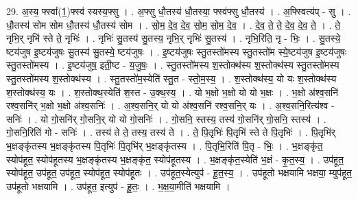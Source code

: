 \documentclass[17pt]{extarticle}
\begin{document}
29. अ॒स्य॒ फ्स्वा᳚(1॒)फ्स्व॑ स्यस्य॒फ्सु । . अ॒फ्सु धौ॒तस्य॑ धौ॒तस्या॒ फ्स्व॑फ्सु धौ॒तस्य॑ । . अ॒फ्स्वित्य॑प् - सु । . धौ॒तस्य॑ सोम सोम धौ॒तस्य॑ धौ॒तस्य॑ सोम । . सो॒म॒ दे॒व॒ दे॒व॒ सो॒म॒ सो॒म॒ दे॒व॒ । . दे॒व॒ ते॒ ते॒ दे॒व॒ दे॒व॒ ते॒ । . ते॒ नृभि॒र् नृभि॑ स्ते ते॒ नृभिः॑ । . नृभिः॑ सु॒तस्य॑ सु॒तस्य॒ नृभि॒र् नृभिः॑ सु॒तस्य॑ । . नृभि॒रिति॒ नृ - भिः॒ । . सु॒तस्ये॒ ष्टय॑जुष इ॒ष्टय॑जुषः सु॒तस्य॑ सु॒तस्ये॒ ष्टय॑जुषः । . इ॒ष्टय॑जुषः स्तु॒तस्तो॑मस्य स्तु॒तस्तो॑म स्ये॒ष्टय॑जुष इ॒ष्टय॑जुषः स्तु॒तस्तो॑मस्य । . इ॒ष्टय॑जुष॒ इती॒ष्ट - य॒जु॒षः॒ । . स्तु॒तस्तो॑मस्य श॒स्तोक्थ॑स्य श॒स्तोक्थ॑स्य स्तु॒तस्तो॑मस्य स्तु॒तस्तो॑मस्य श॒स्तोक्थ॑स्य । . स्तु॒तस्तो॑म॒स्येति॑ स्तु॒त - स्तो॒म॒स्य॒ । . श॒स्तोक्थ॑स्य॒ यो यः श॒स्तोक्थ॑स्य श॒स्तोक्थ॑स्य॒ यः । . श॒स्तोक्थ॒स्येति॑ श॒स्त - उ॒क्थ॒स्य॒ । . यो भ॒क्षो भ॒क्षो यो यो भ॒क्षः । . भ॒क्षो अ॑श्व॒सनि॑ रश्व॒सनि॑र् भ॒क्षो भ॒क्षो अ॑श्व॒सनिः॑ । . अ॒श्व॒सनि॒र् यो यो अ॑श्व॒सनि॑ रश्व॒सनि॒र् यः । . अ॒श्व॒सनि॒रित्य॑श्व - सनिः॑ । . यो गो॒सनि॑र् गो॒सनि॒र् यो यो गो॒सनिः॑ । . गो॒सनि॒ स्तस्य॒ तस्य॑ गो॒सनि॑र् गो॒सनि॒ स्तस्य॑ । . गो॒सनि॒रिति॑ गो - सनिः॑ । . तस्य॑ ते ते॒ तस्य॒ तस्य॑ ते । . ते॒ पि॒तृभिः॑ पि॒तृभि॑ स्ते ते पि॒तृभिः॑ । . पि॒तृभि॑र् भ॒क्षङ्‍कृ॑तस्य भ॒क्षङ्‍कृ॑तस्य पि॒तृभिः॑ पि॒तृभि॑र् भ॒क्षङ्‍कृ॑तस्य । . पि॒तृभि॒रिति॑ पि॒तृ - भिः॒ । . भ॒क्षङ्‍कृ॑त॒ स्योप॑हूत॒ स्योप॑हूतस्य भ॒क्षङ्‍कृ॑तस्य भ॒क्षङ्‍कृ॑त॒ स्योप॑हूतस्य । . भ॒क्षङ्‍कृ॑त॒स्येति॑ भ॒क्षं - कृ॒त॒स्य॒ । . उप॑हूत॒ स्योप॑हूत॒ उप॑हूत॒ उप॑हूत॒ स्योप॑हूत॒ स्योप॑हूतः । . उप॑हूत॒स्येत्युप॑ - हू॒त॒स्य॒ । . उप॑हूतो भक्षयामि भक्षया॒ म्युप॑हूत॒ उप॑हूतो भक्षयामि । . उप॑हूत॒ इत्युप॑ - हू॒तः॒ । . भ॒क्ष॒या॒मीति॑ भक्षयामि । \newline
\end{document}
